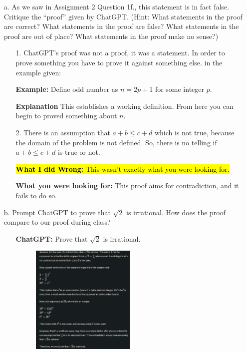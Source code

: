 \documentclass{article}
\begin{document}
\begin{itemize}
    \item[a.] As we saw in Assignment 2 Question 1f., this statement is in fact false.
Critique the “proof” given by ChatGPT. (Hint: What statements in the
proof are correct? What statements in the proof are false? What statements
in the proof are out of place? What statements in the proof make no sense?)
    \begin{itemize}
        \item[1.] ChatGPT's proof was not a proof, it was a statement. In order to prove something you have to prove it against something else. 
        in the example given:
        \item[] \textbf{Example:} Define odd number as $n = 2p + 1$ for some integer $p$.
        \item[] \textbf{Explanation} This establishes a working definition. From here you can begin to proved something about $n$.
        \item[]
        \item[2.] There is an assumption that $a + b \leq c + d$ which is not true, because the domain of the problem is not defined.
        So, there is no telling if $a + b \leq c + d$ is true or not.
        \item[]
        \item[] \hl{\textbf{What I did Wrong: } This wasn't exactly what you were looking for.}
        \item[] \textbf{What you were looking for: } This proof aims for contradiction, and it fails to do so. 
    \end{itemize}
\item[b.] Prompt ChatGPT to prove that $\sqrt{2}$ is irrational. How does the proof compare 
to our proof during class? 
\begin{itemize}
    \item[] \textbf{ChatGPT:} Prove that $\sqrt{2}$ is irrational.
\begin{figure}[H]
    \centering
    \includegraphics[width=0.5\textwidth]{ChatGPTsqrt2.png}

\end{figure}
\end{itemize}
\end{itemize}
\end{document}
